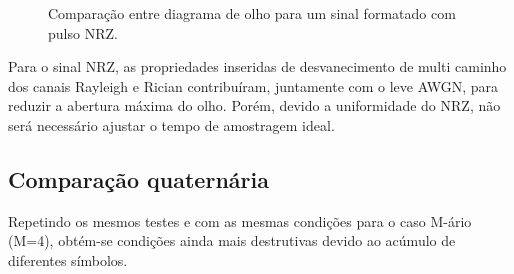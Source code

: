 \begin{figure}[H]
\begin{center}
\end{center}
\caption{Comparação entre diagrama de olho para um sinal formatado com pulso NRZ.}
\label{fig:4} 
\end{figure}

Para o sinal NRZ, as propriedades inseridas de desvanecimento de multi caminho dos canais Rayleigh e Rician contribuíram, juntamente com o leve AWGN, para reduzir a abertura máxima do olho. Porém, devido a uniformidade do NRZ, não será necessário ajustar o tempo de amostragem ideal.

\subsection*{Comparação quaternária}

Repetindo os mesmos testes e com as mesmas condições para o caso M-ário (M=4), obtém-se condições ainda mais destrutivas devido ao acúmulo de diferentes símbolos.

